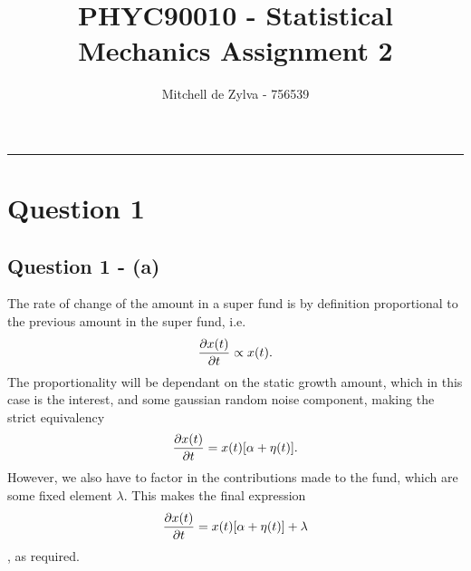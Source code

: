 \documentclass[11pt,a4paper]{article}
\begin{document}
\title{\bf PHYC90010 - Statistical Mechanics Assignment 2}
\author{Mitchell de Zylva - 756539}
\maketitle



\begin{center}
\vspace{1cm}
\rule{145mm}{0.5mm}
\vspace{1cm}
\end{center}
\tableofcontents
\newpage
%
\newpage




\section{Question 1}
\label{sec:question1}
\subsection{Question 1 - (a)}
\label{sec:question1:subsec:parta}
The rate of change of the amount in a super fund is by definition proportional to the previous amount in the super fund, i.e. 
$$\pdv{x(t)}{t} \propto x(t) .$$
The proportionality will be dependant on the static growth amount, which in this case is the interest, and some gaussian random noise component, making the strict equivalency 
$$\pdv{x(t)}{t} = x(t) [\alpha + \eta(t)] .$$
However, we also have to factor in the contributions made to the fund, which are some fixed element $\lambda$. This makes the final expression
\begin{align}\label{eq:langevin}
  \pdv{x(t)}{t} = x(t) [\alpha + \eta(t)] + \lambda
\end{align}
, as required.
\end{document}
